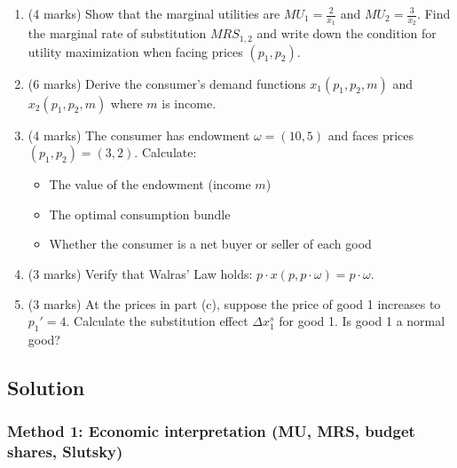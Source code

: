 \documentclass[12pt]{article}
\begin{document}
\begin{enumerate}[label=(\alph*)]
\item (4 marks) Show that the marginal utilities are $MU_1 = \frac{2}{x_1}$ and $MU_2 = \frac{3}{x_2}$. Find the marginal rate of substitution $MRS_{1,2}$ and write down the condition for utility maximization when facing prices $(p_1, p_2)$.

\item (6 marks) Derive the consumer's demand functions $x_1(p_1, p_2, m)$ and $x_2(p_1, p_2, m)$ where $m$ is income.

\item (4 marks) The consumer has endowment $\omega = (10, 5)$ and faces prices $(p_1, p_2) = (3, 2)$. Calculate:
\begin{itemize}
\item The value of the endowment (income $m$)
\item The optimal consumption bundle
\item Whether the consumer is a net buyer or seller of each good
\end{itemize}

\item (3 marks) Verify that Walras' Law holds: $p \cdot x(p, p \cdot \omega) = p \cdot \omega$.

\item (3 marks) At the prices in part (c), suppose the price of good 1 increases to $p_1' = 4$. Calculate the substitution effect $\Delta x_1^s$ for good 1. Is good 1 a normal good?
\end{enumerate}

\newpage

\subsection*{Solution}

\subsubsection*{Method 1: Economic interpretation (MU, MRS, budget shares, Slutsky)}
\end{document}
